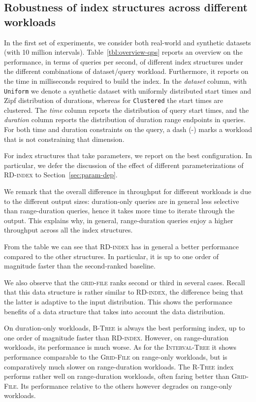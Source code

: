 \documentclass[sigconf,nonacm,anonymous]{acmart}
\theoremstyle{definition}
\newcommand{\algo}[1]{\textsc{#1}}
\newcommand{\ours}{\algo{RD-index}\xspace}
\newcommand{\qrd}{range-duration\xspace}
\newcommand{\qdo}{duration-only\xspace}
\newcommand{\qro}{range-only\xspace}
\newcommand{\dataset}[1]{\texttt{#1}}
\newcommand{\btree}{\algo{B-Tree}\xspace}
\newcommand{\rtree}{\algo{R-Tree}\xspace}
\newcommand{\itree}{\algo{Interval-Tree}\xspace}
\newcommand{\gfile}{\algo{Grid-File}\xspace}
\begin{document}
\subsection{Robustness of index structures across different workloads}
\label{sec:overview}


In the first set of experiments, we consider both real-world and synthetic datasets
(with 10 million intervals).
Table~\ref{tbl:overview-qps} reports an overview
on the performance, in terms of queries per second, of
different index structures under the different combinations of dataset/query workload.
Furthermore, it reports on the time in milliseconds required to build the index.
In the \emph{dataset} column, with
\dataset{Uniform} we denote a synthetic dataset with uniformly distributed start times and Zipf distribution of durations, whereas for \dataset{Clustered}
the start times are clustered.
The \emph{time} column reports the distribution of query start times, and the \emph{duration} column reports the distribution of duration range endpoints in queries.
For both time and duration constraints on the query, a dash (-) marks a workload that is not
constraining that dimension.

For index structures that take parameters, we report on the best configuration.
In particular, we defer the discussion of the effect of different
parameterizations of \ours to Section~\ref{sec:param-dep}.

We remark that the overall difference in throughput for different workloads is
due to the different output sizes: \qdo queries are in general less selective than \qrd queries,
hence it takes more time to iterate through the output.
This explains why, in general, \qrd queries enjoy a higher throughput across all the index structures.

From the table we can see that \ours has in general a better performance compared to the other
structures.
In particular, it is up to one order of magnitude faster than the second-ranked baseline.

We also observe that the \algo{grid-file} ranks second or third in several cases.
Recall that this data structure is rather similar to \ours, the difference being
that the latter is adaptive to the input distribution.
This shows the performance benefits of a data structure that takes into account the data distribution.

On \qdo workloads, \btree is always the best performing index, up to one order of
magnitude faster than \ours.
However, on \qrd workloads, its performance is much worse.
As for the \itree it shows performance comparable to the \gfile on \qro
workloads, but is comparatively much slower on \qrd workloads.
The \rtree index performs rather well on \qrd workloads, often faring better than \gfile.
Its performance relative to the others however degrades on \qro workloads.
\end{document}
